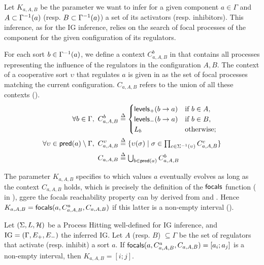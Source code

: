 Let $K_{a,A,B}$ be the parameter we want to infer for a given component $a \in \Gamma$
and $A \subset \Gamma^{-1}(a)$ (resp. $B \subset \Gamma^{-1}(a)$) a set of its activators (resp. inhibitors).
This inference, as for the IG inference, relies on the search of focal processes of the component for the given configuration of its regulators.

For each sort $b \in \Gamma^{-1}(a)$, we define a context $C^b_{a,A,B}$ in  that contains all processes representing the influence of the regulators in the configuration $A,B$.
The context of a cooperative sort $\upsilon$ that regulates $a$ is given in
 as the set of focal processes matching the current configuration.
$C_{a,A,B}$ refers to the union of all these contexts ().
\begin{align}
\label{eq:param_context}
\forall b\in\Gamma,~
C_{a,A,B}^b & \stackrel{\Delta}= \begin{cases}
\mathsf{levels}_+(b\rightarrow a) & \text{if $b \in A$,}\\
\mathsf{levels}_-(b\rightarrow a) & \text{if $b \in B$,}\\
L_b		& \text{otherwise;}\\
\end{cases}
\\
\label{eq:param_context_coop}
\forall \upsilon \in \mathsf{pred}(a)\setminus\Gamma,~
C_{a,A,B}^\upsilon & \stackrel{\Delta}= \{
\upsilon(\sigma) \mid \sigma \in \textstyle\prod_{c\in\Sigma^{-1}(\upsilon)}C_{a,A,B}^c \}
\\
C_{a,A,B} & \stackrel{\Delta}= \textstyle\bigcup_{b\in\mathsf{pred}(a)} C^b_{a,A,B}
\label{eq:K-ctx}
\end{align}

The parameter $K_{a,A,B}$ specifies to which values $a$ eventually evolves as long as the context
$C_{a,A,B}$ holds, which is precisely the definition of the $\mathsf{focals}$ function
( in ),
ggere the focals reachability property can by derived from  and
.
Hence $K_{a,A,B} = \mathsf{focals}(a,C^a_{a,A,B},C_{a,A,B})$ if this latter is a non-empty interval
().

\begin{proposition}
\label{pps:param_K}
Let $(\Sigma, L, \mathcal{H})$ be a Process Hitting well-defined for IG inference, and $\mathrm{IG} = (\Gamma,
E_+, E_-)$ the inferred IG.
Let $A$ (resp. $B$) $\subseteq \Gamma$ be the set of regulators that activate (resp. inhibit) a sort
$a$.
If $\mathsf{focals}(a,C^a_{a,A,B},C_{a,A,B})=[a_i;a_j]$ is a non-empty interval, 
	then $K_{a,A,B} = [i;j]$.
\end{proposition}

